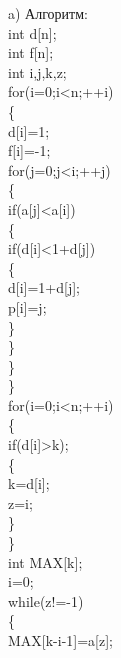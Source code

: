 \documentclass[a4paper,12pt]{article}
\begin{document}
a)
Алгоритм: \\
int d[n];\\
int f[n];\\
int i,j,k,z;\\
for(i=0;i<n;++i)\\
\{\\
\hspace*{20pt} d[i]=1;\\
\hspace*{20pt} f[i]=-1;\\
\hspace*{20pt} for(j=0;j<i;++j)\\
\hspace*{20pt} \{\\
\hspace*{40pt} if(a[j]<a[i])\\
\hspace*{40pt} \{\\
\hspace*{60pt} if(d[i]<1+d[j])\\
\hspace*{60pt} \{\\
\hspace*{80pt} d[i]=1+d[j];\\
\hspace*{80pt} p[i]=j;\\
\hspace*{60pt} \}\\
\hspace*{40pt} \}\\
\hspace*{20pt} \}\\
\}\\
for(i=0;i<n;++i)\\
\{\\
\hspace*{20pt} if(d[i]>k);\\
\hspace*{20pt}  \{\\
\hspace*{40pt}  k=d[i];\\
\hspace*{40pt}  z=i;\\
\hspace*{20pt}  \}\\
\}\\
int MAX[k];\\
i=0;\\
while(z!=-1)\\
\{\\
\hspace*{20pt} MAX[k-i-1]=a[z];\\
\end{document}
